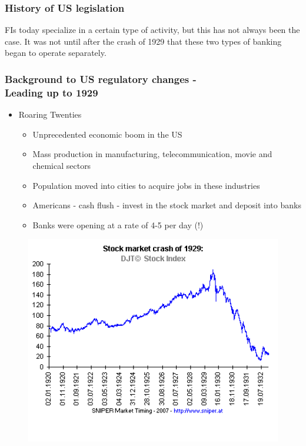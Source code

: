 \documentclass[11pt]{beamer}
\begin{document}

\begin{frame}
\frametitle{History of US legislation}




FIs today specialize in a certain type of activity, but this has not always been the case.
It was not until after the crash of 1929 that these two types of banking began to operate separately.

\end{frame}


\begin{frame}
\frametitle{Background to US regulatory changes -\\ Leading up to 1929}
\begin{itemize}
\item Roaring Twenties
	\begin{itemize}
	\item Unprecedented economic boom in the US
    \item Mass production in manufacturing, telecommunication, movie and chemical sectors
    \item Population moved into cities to acquire jobs in these industries
    \item Americans - cash flush - invest in the stock market and deposit into banks
    \item Banks were opening at a rate of 4-5 per day (!)
	\end{itemize}

\end{itemize}

\end{frame}
\begin{frame}
\begin{figure}
	\includegraphics[width=1\textwidth]{Stockmarket.png}
\end{figure}

\end{frame}
\end{document}
